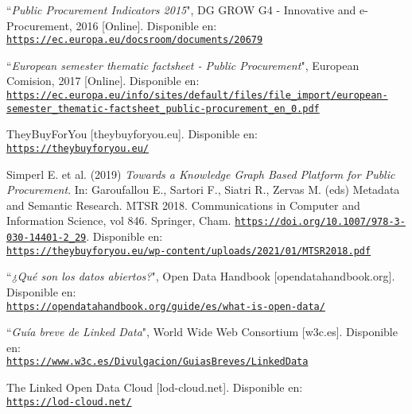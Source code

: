  \label{sec:referencias}

\begingroup
    \renewcommand{\section}[2]{}%
    \begin{thebibliography}{X}
    
            ``\textit{Public Procurement Indicators 2015}", DG GROW G4 - Innovative and e-Procurement, 2016 [Online]. Disponible en: 
            \\ \texttt{\url{https://ec.europa.eu/docsroom/documents/20679}}
            
            ``\textit{European semester thematic factsheet - Public Procurement}", European Comision, 2017 [Online]. Disponible en:  
            \\ \texttt{\url{https://ec.europa.eu/info/sites/default/files/file_import/european-semester_thematic-factsheet_public-procurement_en_0.pdf}}
    
            TheyBuyForYou [theybuyforyou.eu]. Disponible en:
            \\ \texttt{\url{https://theybuyforyou.eu/}}
            
            Simperl E. et al. (2019) \textit{Towards a Knowledge Graph Based Platform for Public Procurement}. In: Garoufallou E., Sartori F., Siatri R., Zervas M. (eds) Metadata and Semantic Research. MTSR 2018. Communications in Computer and Information Science, vol 846. Springer, Cham. \texttt{\url{https://doi.org/10.1007/978-3-030-14401-2_29}}. Disponible en:
            \\ \texttt{\url{https://theybuyforyou.eu/wp-content/uploads/2021/01/MTSR2018.pdf}}
    
            ``\textit{¿Qué son los datos abiertos?}", Open Data Handbook [opendatahandbook.org]. Disponible en:  
            \\ \texttt{\url{https://opendatahandbook.org/guide/es/what-is-open-data/}}
            
            ``\textit{Guía breve de Linked Data}", World Wide Web Consortium  [w3c.es]. Disponible en:
            \\ \texttt{\url{https://www.w3c.es/Divulgacion/GuiasBreves/LinkedData}}
            
            The Linked Open Data Cloud [lod-cloud.net]. Disponible en:
            \\ \texttt{\url{https://lod-cloud.net/}}
            

\end{thebibliography}
